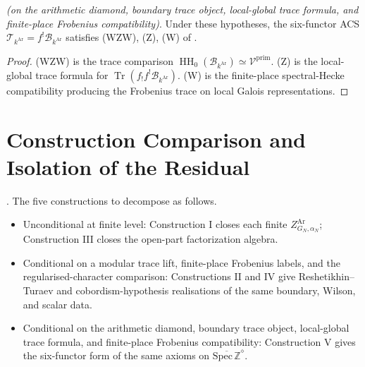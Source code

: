\begin{theorem}
\label{v4-arith:w10-a:thm:construction-V-closure}
\ClaimStatusProvedHereConditional \emph{(on the arithmetic diamond,
boundary trace object, local-global trace formula, and finite-place
Frobenius compatibility)}. Under these hypotheses, the six-functor ACS
\(\mathcal T_{k^{\mathrm{Ar}}}=f^{!}\mathscr B_{k^{\mathrm{Ar}}}\)
satisfies (WZW), (Z), (W) of
.
\end{theorem}

\begin{proof}
(WZW) is the trace comparison
\(\operatorname{HH}_{0}(\mathscr B_{k^{\mathrm{Ar}}})
\simeq\mathcal V^{\mathrm{prim}}\). (Z) is the local-global trace
formula for
\(\operatorname{Tr}(f_{!}f^{!}\mathscr B_{k^{\mathrm{Ar}}})\). (W) is
the finite-place spectral-Hecke compatibility producing the Frobenius
trace on local Galois representations.
\end{proof}

\section{Construction Comparison and Isolation of the Residual}
\label{v4-arith:w10-a:comparison}

\begin{theorem}
\label{v4-arith:w10-a:thm:construction-comparison}
\ClaimStatusProvedHere. The five constructions to
 decompose as follows.
\begin{itemize}
\item Unconditional at finite level: Construction I closes each finite
\(Z^{\mathrm{Ar}}_{G_{N},\alpha_{N}}\); Construction III closes the open-part
factorization algebra.
\item Conditional on a modular trace lift, finite-place Frobenius
labels, and the regularised-character comparison: Constructions II and
IV give Reshetikhin--Turaev and cobordism-hypothesis realisations of
the same boundary, Wilson, and scalar data.
\item Conditional on the arithmetic diamond, boundary trace object,
local-global trace formula, and finite-place Frobenius compatibility:
Construction V gives the six-functor form of the same axioms on
\(\overline{\mathrm{Spec}\,\mathbb Z}^{\diamond}\).
\end{itemize}
\end{theorem}


